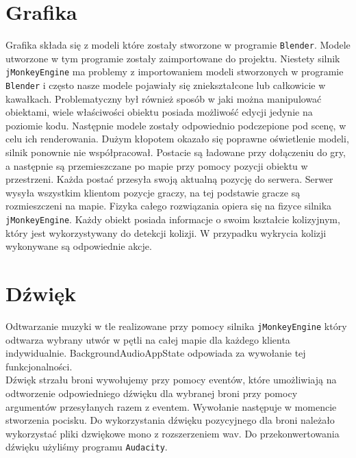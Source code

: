 \documentclass[]{report}
\newcommand{\code}[1]{\colorbox{codegray}{\texttt{#1}}}
\begin{document}
\section{Grafika}
	Grafika składa się z modeli które zostały stworzone w programie \code{Blender}.
	Modele utworzone w tym programie zostały zaimportowane do projektu. 
	Niestety silnik \code{jMonkeyEngine} ma problemy z importowaniem modeli stworzonych w programie \code{Blender} i często nasze modele pojawiały się zniekształcone lub całkowicie w kawałkach.
	Problematyczny był również sposób w jaki można manipulować obiektami, wiele właściwości obiektu posiada możliwość edycji jedynie na poziomie kodu. 
	Następnie modele zostały odpowiednio podczepione pod scenę, w celu ich renderowania.
	Dużym kłopotem okazało się poprawne oświetlenie modeli, silnik ponownie nie współpracował.
	Postacie są ładowane przy dołączeniu do gry, a następnie są przemieszczane po mapie przy pomocy pozycji obiektu w przestrzeni.
	Każda postać przesyła swoją aktualną pozycję do serwera.
	Serwer wysyła wszystkim klientom pozycje graczy, na tej podstawie gracze są rozmieszczeni na mapie.
	Fizyka całego rozwiązania opiera się na fizyce silnika \code{jMonkeyEngine}.
	Każdy obiekt posiada informacje o swoim kształcie kolizyjnym, który jest wykorzystywany do detekcji kolizji.
	W przypadku wykrycia kolizji wykonywane są odpowiednie akcje.

\section{Dźwięk}
	Odtwarzanie muzyki w tle realizowane przy pomocy silnika \code{jMonkeyEngine} który odtwarza wybrany utwór w pętli na całej mapie dla każdego klienta indywidualnie.
	BackgroundAudioAppState odpowiada za wywołanie tej funkcjonalności. \\
	Dźwięk strzału broni wywołujemy przy pomocy eventów, które umożliwiają na odtworzenie odpowiedniego dźwięku dla wybranej broni przy pomocy argumentów przesyłanych razem z eventem.
	Wywołanie następuje w momencie stworzenia pocisku.
	Do wykorzystania dźwięku pozycyjnego dla broni należało wykorzystać pliki dzwiękowe mono z rozszerzeniem wav.
	Do przekonwertowania dźwięku użyliśmy programu \code{Audacity}.
\end{document}
